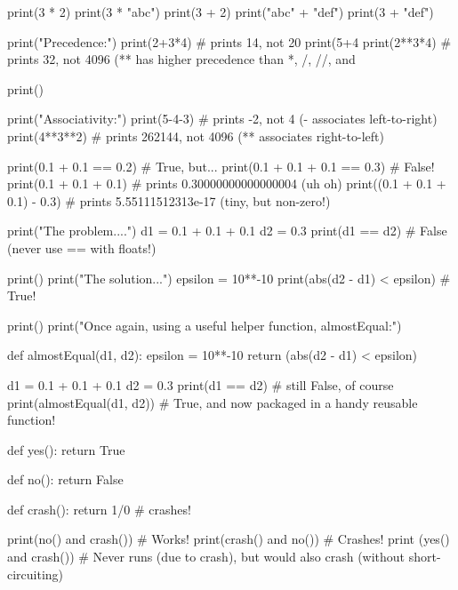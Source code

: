 \begin{runpython}[title=Types Affect Semantics]
print(3 * 2)
print(3 * "abc")
print(3 + 2)
print("abc" + "def")
print(3 + "def")
\end{runpython}

\begin{runpython}[title=Operator Order (Precedence and Associativity)]
print("Precedence:")
print(2+3*4)  # prints 14, not 20
print(5+4%
print(2**3*4) # prints 32, not 4096 (** has higher precedence than *, /, //, and %

print()

print("Associativity:")
print(5-4-3)   # prints -2, not 4 (- associates left-to-right)
print(4**3**2) # prints 262144, not 4096 (** associates right-to-left)
\end{runpython}

\begin{runpython}[title=Approximate Values of Floating-Point Numbers]
print(0.1 + 0.1 == 0.2)        # True, but...
print(0.1 + 0.1 + 0.1 == 0.3)  # False!
print(0.1 + 0.1 + 0.1)         # prints 0.30000000000000004 (uh oh)
print((0.1 + 0.1 + 0.1) - 0.3) # prints 5.55111512313e-17 (tiny, but non-zero!)
\end{runpython}

\begin{runpython}[title=Equality Testing with almostEqual]
print("The problem....")
d1 = 0.1 + 0.1 + 0.1
d2 = 0.3
print(d1 == d2)                # False (never use == with floats!)

print()
print("The solution...")
epsilon = 10**-10
print(abs(d2 - d1) < epsilon)  # True!

print()
print("Once again, using a useful helper function, almostEqual:")

def almostEqual(d1, d2):
    epsilon = 10**-10
    return (abs(d2 - d1) < epsilon)

d1 = 0.1 + 0.1 + 0.1
d2 = 0.3
print(d1 == d2)            # still False, of course
print(almostEqual(d1, d2)) # True, and now packaged in a handy reusable function!
\end{runpython}

\begin{runpython}[title=Short-Circuit Evaluation]
def yes():
    return True

def no():
    return False

def crash():
    return 1/0 # crashes!

print(no() and crash()) # Works!
print(crash() and no()) # Crashes!
print (yes() and crash()) # Never runs (due to crash), but would also crash (without short-circuiting)
\end{runpython}

